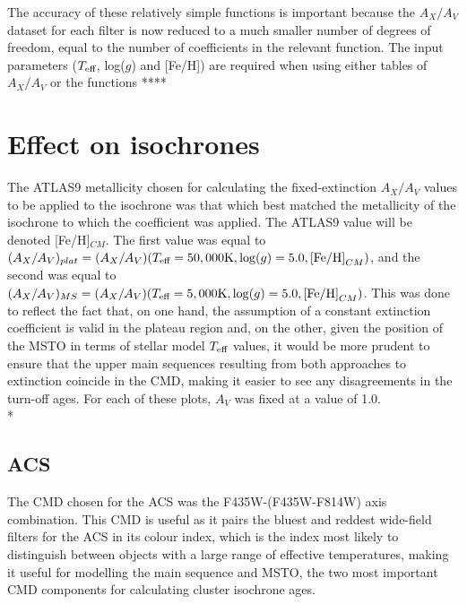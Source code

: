 \documentclass[12pt, a4paper]{report}
\begin{document}
The accuracy of these relatively simple functions is important because the $A_{X}/A_{V}$ dataset for each filter is now reduced to a much smaller number of degrees of freedom, equal to the number of coefficients in the relevant function. The input parameters ($T_{\textnormal{eff}}$, log($g$) and [Fe/H]) are required when using either tables of $A_{X}/A_{V}$ or the functions ****


\section{Effect on isochrones} \label{result_CMDs}
The ATLAS9 metallicity chosen for calculating the fixed-extinction $A_{X}/A_{V}$ values to be applied to the isochrone was that which best matched the metallicity of the isochrone to which the coefficient was applied. The ATLAS9 value will be denoted [Fe/H]$_{CM}$. The first value was equal to $(A_{X}/A_{V})_{plat} = (A_{X}/A_{V})(T_{\textnormal{eff}} = 50,000\textnormal{K},\log(g) = 5.0,\textnormal{[Fe/H]}_{CM})$, and the second was equal to $(A_{X}/A_{V})_{MS} = (A_{X}/A_{V})(T_{\textnormal{eff}} = 5,000\textnormal{K},\log(g) = 5.0,\textnormal{[Fe/H]}_{CM})$. This was done to reflect the fact that, on one hand, the assumption of a constant extinction coefficient is valid in the plateau region and, on the other, given the position of the MSTO in terms of stellar model $T_{\textnormal{eff}}$ values, it would be more prudent to ensure that the upper main sequences resulting from both approaches to extinction coincide in the CMD, making it easier to see any disagreements in the turn-off ages. For each of these plots, $A_{V}$ was fixed at a value of 1.0.\\*

\subsection{ACS} \label{ACS_isoc}
The CMD chosen for the ACS was the F435W-(F435W-F814W) axis combination. This CMD is useful as it pairs the bluest and reddest wide-field filters for the ACS in its colour index, which is the index most likely to distinguish between objects with a large range of effective temperatures, making it useful for modelling the main sequence and MSTO, the two most important CMD components for calculating cluster isochrone ages.
\end{document}
